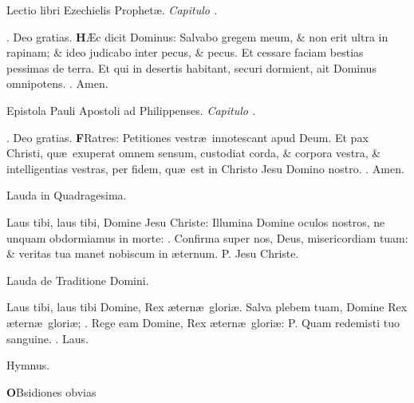 \documentclass[letter,11pt]{book}
\makeatletter
\DeclareRobustCommand{\Vbar}{\vers@resp{-0.1em}{V}}
\DeclareRobustCommand{\Rbar}{\vers@resp{0pt}{R}}
\newcommand{\vers@resp@sym}{\raisebox{0.2ex}{\rotatebox[origin=c]{-20}{$\m@th\rceil$}}}
\newcommand{\vers@resp}[2]{%
  {\ooalign{\hidewidth\kern#1\vers@resp@sym\hidewidth\cr#2\cr}}%
}%
\def\P{\color{Red} P. \color{black}}
\def\V{\color{Red} \Vbar . \color{black}}
\def\R{\color{Red} \Rbar . \color{black}}
\makeatother
\begin{document}
\begin{multicols*}{2}
\vspace{-.5em} \begin{center} {\color{Red} L}ectio libri Ezechielis Prophet\ae . \itshape Capitulo . \end{center} \vspace{-.5em}
\par \noindent \R Deo gratias.
\lettrine[lines=2]{\bfseries \color{Red} H}{}\AE c dicit Dominus: Salvabo gregem meum, \& non erit ultra in rapinam; \& ideo judicabo inter pecus, \& pecus. Et cessare faciam bestias pessimas de terra. Et qui in desertis habitant, securi dormient, ait Dominus omnipotens. \R Amen.
\vspace{-.5em} \begin{center} {\color{Red} E}pistola Pauli Apostoli ad Philippenses. \itshape Capitulo . \end{center} \vspace{-.5em}
\par \noindent \R Deo gratias.
\lettrine[lines=2]{\bfseries \color{Red} F}{}Ratres: Petitiones vestr\ae \ innotescant apud Deum. Et pax Christi, qu\ae \ exuperat omnem sensum, custodiat corda, \& corpora vestra, \& intelligentias vestras, per fidem, qu\ae \ est in Christo Jesu Domino nostro. \R Amen.
\vspace{-.5em} \begin{center} \color{Red} Lauda in Quadragesima. \end{center} \vspace{-.5em}
\par \noindent Laus tibi, laus tibi, Domine Jesu Christe: Illumina Domine oculos nostros, ne unquam obdormiamus in morte: \V Confirma super nos, Deus, misericordiam tuam: \& veritas tua manet nobiscum in \ae ternum. \P Jesu Christe.
\vspace{-.5em} \begin{center} \color{Red} Lauda de Traditione Domini. \end{center} \vspace{-.5em}
\par \noindent Laus tibi, laus tibi Domine, Rex \ae tern\ae \ glori\ae . Salva plebem tuam, Domine Rex \ae tern\ae \ glori\ae ; \V Rege eam Domine, Rex \ae tern\ae \ glori\ae : \P Quam redemisti tuo sanguine. \V Laus.
\vspace{-.5em} \begin{center} \color{Red} Hymnus. \end{center} \vspace{-.5em}
\lettrine[lines=2]{\bfseries \color{Red} O}{}Bsidiones obvias

\end{multicols*}
\end{document}
